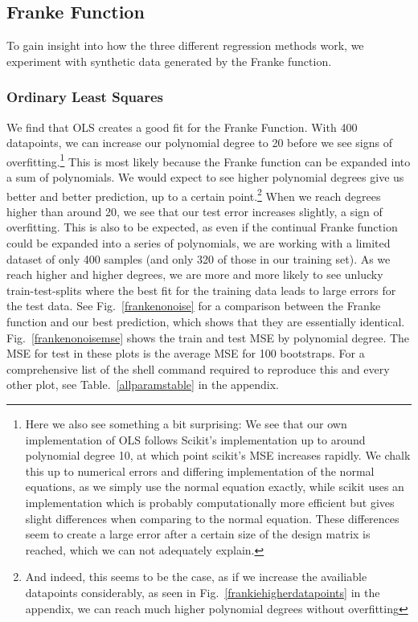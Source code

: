 \documentclass[twocolumn,10pt,cleanfoot]{asme2ej}
\begin{document}
\subsection{Franke Function}

To gain insight into how the three different regression methods work, we experiment with synthetic data generated by the Franke function.

\subsubsection{Ordinary Least Squares}

We find that OLS creates a good fit for the Franke Function. With 400 datapoints, we can increase our polynomial degree to 20 before we see signs of overfitting.\footnote{Here we also see something a bit surprising: We see that our own implementation of OLS follows Scikit's implementation up to around polynomial degree 10, at which point scikit's MSE increases rapidly. We chalk this up to numerical errors and differing implementation of the normal equations, as we simply use the normal equation exactly, while scikit uses an implementation which is probably computationally more efficient but gives slight differences when comparing to the normal equation. These differences seem to create a large error after a certain size of the design matrix is reached, which we can not adequately explain.} This is most likely because the Franke function can be expanded into a sum of polynomials. We would expect to see higher polynomial degrees give us better and better prediction, up to a certain point.\footnote{And indeed, this seems to be the case, as if we increase the availiable datapoints considerably, as seen in Fig.~\ref{frankiehigherdatapoints} in the appendix, we can reach much higher polynomial degrees without overfitting} When we reach degrees higher than around 20, we see that our test error increases slightly, a sign of overfitting. This is also to be expected, as even if the continual Franke function could be expanded into a series of polynomials, we are working with a limited dataset of only 400 samples (and only 320 of those in our training set). As we reach higher and higher degrees, we are more and more likely to see unlucky train-test-splits where the best fit for the training data leads to large errors for the test data. See Fig.~\ref{frankenonoise} for a comparison between the Franke function and our best prediction, which shows that they are essentially identical. Fig.~\ref{frankenonoisemse} shows the train and test MSE by polynomial degree. The MSE for test in these plots is the average MSE for 100 bootstraps. For a comprehensive list of the shell command required to reproduce this and every other plot, see Table.~\ref{allparamstable} in the appendix.
\end{document}
